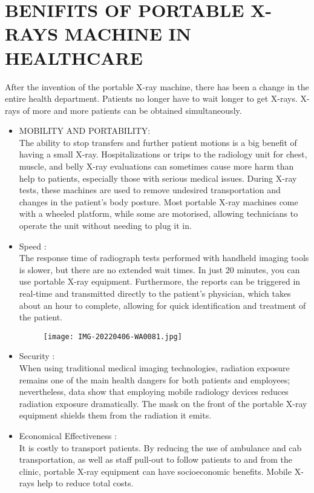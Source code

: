 \documentclass[12pt]{article}
\begin{document}
\section{BENIFITS OF PORTABLE X-RAYS MACHINE IN HEALTHCARE}
After the invention of the portable X-ray machine, there has been a change in the entire health department.  Patients no longer have to wait longer to get X-rays.  X-rays of more and more patients can be obtained simultaneously.
\begin{itemize}
\item MOBILITY AND PORTABILITY:
\\
The ability to stop transfers and further patient motions is a big benefit of having a small X-ray. Hospitalizations or trips to the radiology unit for chest, muscle, and belly X-ray evaluations can sometimes cause more harm than help to patients, especially those with serious medical issues.
During X-ray tests, these machines are used to remove undesired transportation and changes in the patient's body posture.
Most portable X-ray machines come with a wheeled platform, while some are motorised, allowing technicians to operate the unit without needing to plug it in.
\\
\item Speed :
\\
The response time of radiograph tests performed with handheld imaging tools is slower, but there are no extended wait times.
In just 20 minutes, you can use portable X-ray equipment. Furthermore, the reports can be triggered in real-time and transmitted directly to the patient's physician, which takes about an hour to complete, allowing for quick identification and treatment of the patient.
\begin{figure}
\centering
\texttt{[image: IMG-20220406-WA0081.jpg]}
\caption{}
\end{figure}
\item Security :
\\
When using traditional medical imaging technologies, radiation exposure remains one of the main health dangers for both patients and employees; nevertheless, data show that employing mobile radiology devices reduces radiation exposure dramatically.
The mask on the front of the portable X-ray equipment shields them from the radiation it emits.
\\
\item Economical Effectiveness :
\\
It is costly to transport patients. By reducing the use of ambulance and cab transportation, as well as staff pull-out to follow patients to and from the clinic, portable X-ray equipment can have socioeconomic benefits. Mobile X-rays help to reduce total costs.

\end{itemize}
\end{document}

